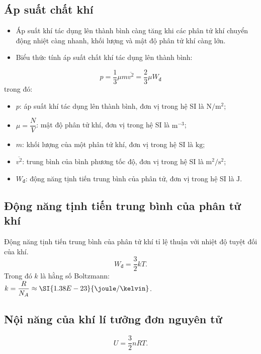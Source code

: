 \subsection{Áp suất chất khí}
\begin{itemize}
	\item Áp suất khí tác dụng lên thành bình càng tăng khi các phân tử khí chuyển động nhiệt càng nhanh, khối lượng và mật độ phân tử khí càng lớn.
	\item Biểu thức tính áp suất chất khí tác dụng lên thành bình:
\end{itemize}
$$p=\dfrac{1}{3}\mu m\overline{v^2}=\dfrac{2}{3}\mu W_{\text{đ}}$$
trong đó:
\begin{itemize}
	\item $p$: áp suất khí tác dụng lên thành bình, đơn vị trong hệ SI là $\si{\newton/\meter^2}$;
	\item $\mu=\dfrac{N}{V}$: mật độ phân tử khí, đơn vị trong hệ SI là $\si{\meter^{-3}}$;
	\item $m$: khối lượng của một phân tử khí, đơn vị trong hệ SI là $\si{\kilogram}$;
	\item $\overline{v^2}$: trung bình của bình phương tốc độ, đơn vị trong hệ SI là $\si{\meter^2/\second^2}$;
	\item $W_{\text{đ}}$: động năng tịnh tiến trung bình của phân tử, đơn vị trong hệ SI là $\si{\joule}$.
\end{itemize}
\subsection{Động năng tịnh tiến trung bình của phân tử khí}
Động năng tịnh tiến trung bình của phân tử khí tỉ lệ thuận với nhiệt độ tuyệt đối của khí.
$$W_{\text{đ}}=\dfrac{3}{2}kT.$$
Trong đó $k$ là hằng số Boltzmann: $k=\dfrac{R}{N_A}\approx\SI{1.38E-23}{\joule/\kelvin}$.
\subsection{Nội năng của khí lí tưởng đơn nguyên tử}
$$U=\dfrac{3}{2}nRT.$$